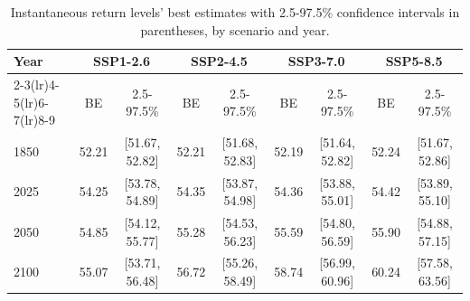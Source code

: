 \begin{table}[htbp]
\centering
\begin{tabular}{lcccccccc}
\toprule
Year & \multicolumn{2}{c}{\textbf{SSP1-2.6}} & \multicolumn{2}{c}{\textbf{SSP2-4.5}} & \multicolumn{2}{c}{\textbf{SSP3-7.0}} & \multicolumn{2}{c}{\textbf{SSP5-8.5}} \\
\cmidrule(lr){2-3}\cmidrule(lr){4-5}\cmidrule(lr){6-7}\cmidrule(lr){8-9}
 & BE & 2.5-97.5\% & BE & 2.5-97.5\% & BE & 2.5-97.5\% & BE & 2.5-97.5\% \\
\midrule
1850 & 52.21 & [51.67, 52.82] & 52.21 & [51.68, 52.83] & 52.19 & [51.64, 52.82] & 52.24 & [51.67, 52.86] \\
2025 & 54.25 & [53.78, 54.89] & 54.35 & [53.87, 54.98] & 54.36 & [53.88, 55.01] & 54.42 & [53.89, 55.10] \\
2050 & 54.85 & [54.12, 55.77] & 55.28 & [54.53, 56.23] & 55.59 & [54.80, 56.59] & 55.90 & [54.88, 57.15] \\
2100 & 55.07 & [53.71, 56.48] & 56.72 & [55.26, 58.49] & 58.74 & [56.99, 60.96] & 60.24 & [57.58, 63.56] \\
\bottomrule
\end{tabular}
\caption{Instantaneous return levels' best estimates with 2.5-97.5\% confidence intervals in parentheses, by scenario and year.}
\label{tab:scenarios}
\end{table}